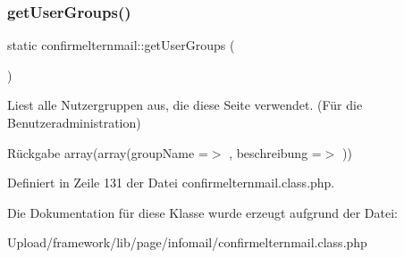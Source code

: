 \subsubsection{\texorpdfstring{get\+User\+Groups()}{getUserGroups()}}
{\footnotesize\ttfamily static confirmelternmail\+::get\+User\+Groups (\begin{DoxyParamCaption}{ }\end{DoxyParamCaption})\hspace{0.3cm}{\ttfamily [static]}}

Liest alle Nutzergruppen aus, die diese Seite verwendet. (Für die Benutzeradministration) \begin{DoxyReturn}{Rückgabe}
array(array(\textquotesingle{}group\+Name\textquotesingle{} =$>$ \textquotesingle{}\textquotesingle{}, \textquotesingle{}beschreibung\textquotesingle{} =$>$ \textquotesingle{}\textquotesingle{})) 
\end{DoxyReturn}


Definiert in Zeile 131 der Datei confirmelternmail.\+class.\+php.



Die Dokumentation für diese Klasse wurde erzeugt aufgrund der Datei\+:\begin{DoxyCompactItemize}
\item 
Upload/framework/lib/page/infomail/confirmelternmail.\+class.\+php\end{DoxyCompactItemize}
